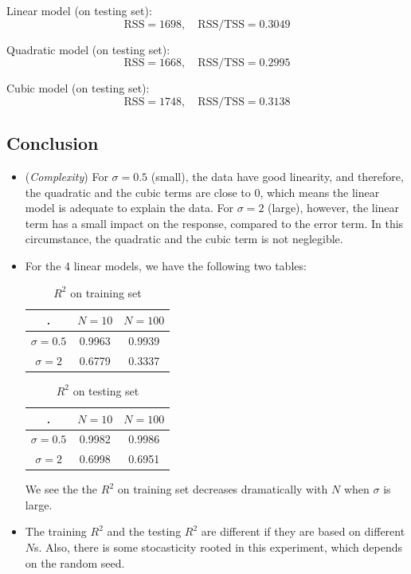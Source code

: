 \documentclass{article}
\begin{document}
{{        Linear model (on testing set): $$\mathrm{RSS} = 1698, \quad \mathrm{RSS}/\mathrm{TSS} = 0.3049$$

        Quadratic model (on testing set): $$\mathrm{RSS} = 1668, \quad \mathrm{RSS}/\mathrm{TSS} = 0.2995$$

        Cubic model (on testing set): $$\mathrm{RSS} = 1748, \quad \mathrm{RSS}/\mathrm{TSS} = 0.3138$$
    }

    \subsection*{Conclusion}
    {
        \begin{itemize}
            \item (\emph{Complexity}) For $\sigma = 0.5$ (small), the data have good linearity, and therefore, the quadratic and the cubic terms are close to 0, which means the linear model is adequate to explain the data. For $\sigma = 2$ (large), however, the linear term has a small impact on the response, compared to the error term. In this circumstance, the quadratic and the cubic term is not neglegible. 

            \item For the 4 linear models, we have the following two tables:

            \begin{table}[!hbp]
                \begin{tabular}{|c|c|c|}
                \hline
                . & $N=10$ & $N=100$ \\
                \hline
                $\sigma=0.5$ & 0.9963 & 0.9939 \\
                \hline
                $\sigma=2$ & 0.6779 & 0.3337 \\
                \hline
                \end{tabular}
                \caption{$R^2$ on training set}
            \end{table}

            \begin{table}[!hbp]
                \begin{tabular}{|c|c|c|}
                \hline
                . & $N=10$ & $N=100$ \\
                \hline
                $\sigma=0.5$ & 0.9982 & 0.9986 \\
                \hline
                $\sigma=2$ & 0.6998 & 0.6951 \\
                \hline
                \end{tabular}
                \caption{$R^2$ on testing set}
            \end{table}

            We see the the $R^2$ on training set decreases dramatically with $N$ when $\sigma$ is large. 

            \item The training $R^2$ and the testing $R^2$ are different if they are based on different $N$s. Also, there is some stocasticity rooted in this experiment, which depends on the random seed.

        \end{itemize}
    }
}
\end{document}
